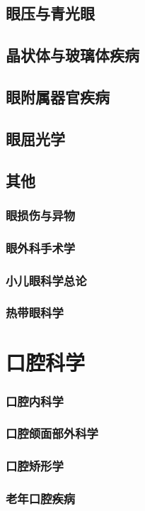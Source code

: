 \documentclass[UTF8]{../ApplicationUniverse}
\begin{document}
    \subsection{眼压与青光眼}
    \subsection{晶状体与玻璃体疾病}
    \subsection{眼附属器官疾病}
    \subsection{眼屈光学}
    \subsection{其他}
        \subsubsection{眼损伤与异物}
        \subsubsection{眼外科手术学}
        \subsubsection{小儿眼科学总论}
        \subsubsection{热带眼科学}
\section{口腔科学}
    \subsubsection{口腔内科学}
    \subsubsection{口腔颌面部外科学}
    \subsubsection{口腔矫形学}
    \subsubsection{老年口腔疾病}
\end{document}
